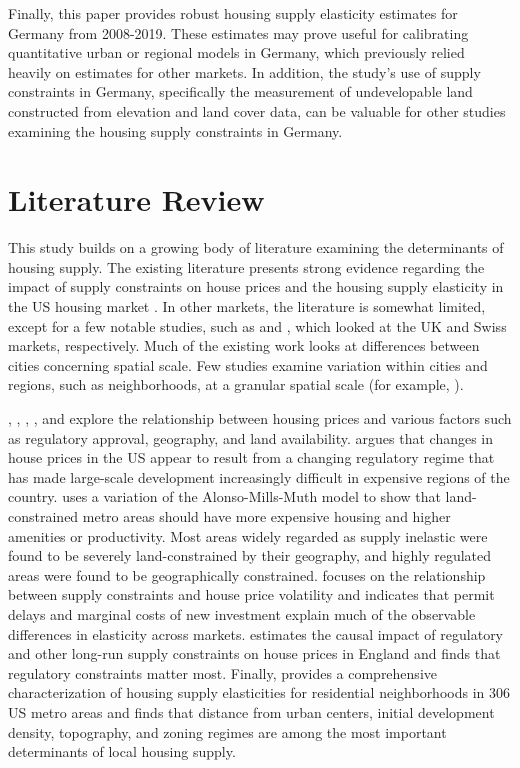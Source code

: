 \documentclass[
  12pt,
]{article}
\begin{document}
Finally, this paper provides robust housing supply elasticity estimates
for Germany from 2008-2019. These estimates may prove useful for
calibrating quantitative urban or regional models in Germany, which
previously relied heavily on estimates for other markets. In addition,
the study's use of supply constraints in Germany, specifically the
measurement of undevelopable land constructed from elevation and land
cover data, can be valuable for other studies examining the housing
supply constraints in Germany.

\section{Literature Review}\label{literature-review}

This study builds on a growing body of literature examining the
determinants of housing supply. The existing literature presents strong
evidence regarding the impact of supply constraints on house prices and
the housing supply elasticity in the US housing market
\citep{glaeser_gyourko_2005, saiz_2010, paciorek_2013, baum-snow_han_2019}.
In other markets, the literature is somewhat limited, except for a few
notable studies, such as \citet{hilber_vermeulen_2016} and
\citet{buchler_etal_2021}, which looked at the UK and Swiss markets,
respectively. Much of the existing work looks at differences between
cities concerning spatial scale. Few studies examine variation within
cities and regions, such as neighborhoods, at a granular spatial scale
(for example, \citet{baum-snow_han_2019}).

\citet{glaeser_gyourko_2005}, \citet{saiz_2010}, \citet{paciorek_2013},
\citet{hilber_vermeulen_2016}, and \citet{baum-snow_han_2019} explore
the relationship between housing prices and various factors such as
regulatory approval, geography, and land availability.
\citet{glaeser_gyourko_2005} argues that changes in house prices in the
US appear to result from a changing regulatory regime that has made
large-scale development increasingly difficult in expensive regions of
the country. \citet{saiz_2010} uses a variation of the Alonso-Mills-Muth
model to show that land-constrained metro areas should have more
expensive housing and higher amenities or productivity. Most areas
widely regarded as supply inelastic were found to be severely
land-constrained by their geography, and highly regulated areas were
found to be geographically constrained. \citet{paciorek_2013} focuses on
the relationship between supply constraints and house price volatility
and indicates that permit delays and marginal costs of new investment
explain much of the observable differences in elasticity across markets.
\citet{hilber_vermeulen_2016} estimates the causal impact of regulatory
and other long-run supply constraints on house prices in England and
finds that regulatory constraints matter most. Finally,
\citet{baum-snow_han_2019} provides a comprehensive characterization of
housing supply elasticities for residential neighborhoods in 306 US
metro areas and finds that distance from urban centers, initial
development density, topography, and zoning regimes are among the most
important determinants of local housing supply.
\end{document}

